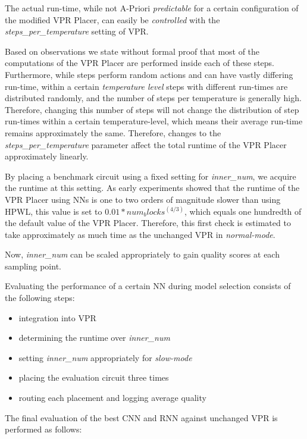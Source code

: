 The actual run-time, while not A-Priori \textit{predictable} for a certain configuration of the modified \gls{VPR} Placer, can easily be \textit{controlled} with the \textit{steps\_per\_temperature}\cite{TODO} setting of \gls{VPR}. 

Based on observations we state without formal proof that most of the computations of the \gls{VPR} Placer are performed inside each of these steps. Furthermore, while steps perform random actions and can have vastly differing run-time, within a certain \textit{temperature level} steps with different run-times are distributed randomly, and the number of steps per temperature is generally high. Therefore, changing this number of steps will not change the distribution of step run-times within a certain temperature-level, which means their average run-time remains approximately the same. Therefore, changes to the \textit{steps\_per\_temperature} parameter affect the total runtime of the \gls{VPR} Placer approximately linearly.

By placing a benchmark circuit using a fixed setting for \textit{inner\_num}, we acquire the runtime at this setting. As early experiments showed that the runtime of the \gls{VPR} Placer using \glspl{NN} is one to two orders of magnitude slower than using \gls{HPWL}, this value is set to $0.01*num_blocks^(4/3)$, which equals one hundredth of the default value of the \gls{VPR} Placer. Therefore, this first check is estimated to take approximately as much time as the unchanged \gls{VPR} in \textit{normal-mode}.

Now, \textit{inner\_num} can be scaled appropriately to gain quality scores at each sampling point.

Evaluating the performance of a certain \gls{NN} during model selection consists of the following steps:

\begin{itemize}
	\item integration into \gls{VPR}
	\item determining the runtime over \textit{inner\_num}
	\item setting \textit{inner\_num} appropriately for \textit{slow-mode}
	\item placing the evaluation circuit three times
	\item routing each placement and logging average quality 
\end{itemize}

The final evaluation of the best \gls{CNN} and \gls{RNN} against unchanged \gls{VPR} is performed as follows:


